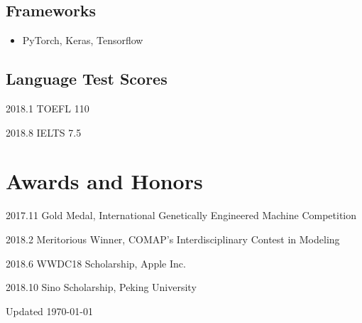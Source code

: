\documentclass{academiccv}
\begin{document}
\subsection*{Frameworks}
\begin{itemize}
	\item PyTorch, Keras, Tensorflow
\end{itemize}

%

\subsection*{Language Test Scores}

\begin{tablist}
	\item[2018.1] \tab TOEFL 110
	\item[2018.8] \tab IELTS 7.5
	\end{tablist}


\section*{Awards and Honors}

\begin{tablist}
	\item[2017.11] \tab Gold Medal, International Genetically Engineered Machine Competition

	\item[2018.2] \tab Meritorious Winner, COMAP's Interdisciplinary Contest in Modeling

	\item[2018.6] \tab WWDC18 Scholarship, Apple Inc.
	
	\item[2018.10] \tab Sino Scholarship, Peking University

	\end{tablist}




\begin{center}
\vspace{6em}
Updated \monthyeardate\today
\end{center}
\end{document}

